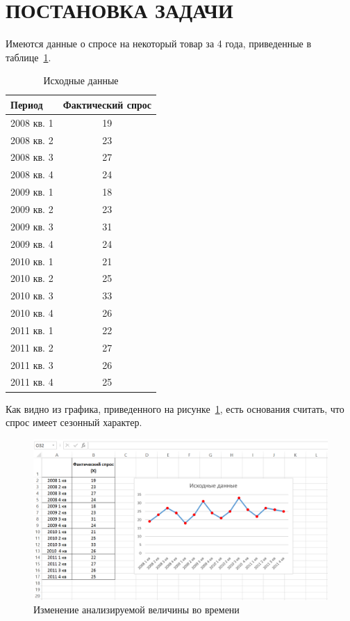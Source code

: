 \section{ПОСТАНОВКА ЗАДАЧИ}

Имеются данные о спросе на некоторый товар за 4 года,
приведенные в таблице~\ref{tbl:source_data}.

\begin{table} [h!]
  \caption{
    Исходные данные
  }\label{tbl:source_data}
    \begin{tabular}{| m{11.4cm} | c |}
      \hline
      Период & Фактический спрос \\ \hline

      2008 кв. 1 & 19 \\ \hline
      2008 кв. 2 & 23 \\ \hline
      2008 кв. 3 & 27 \\ \hline
      2008 кв. 4 & 24 \\ \hline

      2009 кв. 1 & 18 \\ \hline
      2009 кв. 2 & 23 \\ \hline
      2009 кв. 3 & 31 \\ \hline
      2009 кв. 4 & 24 \\ \hline

      2010 кв. 1 & 21 \\ \hline
      2010 кв. 2 & 25 \\ \hline
      2010 кв. 3 & 33 \\ \hline
      2010 кв. 4 & 26 \\ \hline

      2011 кв. 1 & 22 \\ \hline
      2011 кв. 2 & 27 \\ \hline
      2011 кв. 3 & 26 \\ \hline
      2011 кв. 4 & 25 \\ \hline
    \end{tabular}
\end{table}

Как видно из графика, приведенного на рисунке~\ref{fig:source_data}, есть основания считать,
что спрос имеет сезонный характер.

\newpage

\begin{figure}[h!]
  \centering
  \includegraphics[width=160mm]{pic/source_data}
  \caption{Изменение анализируемой величины во времени}
  \label{fig:source_data}
\end{figure}

